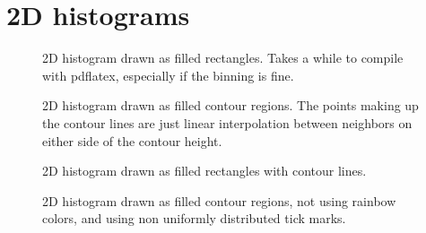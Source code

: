 \documentclass{article}
\begin{document}
\section{2D histograms}
\begin{figure}[H]
\centering

\captionsetup{singlelinecheck=off}
\caption[asdf]{2D histogram drawn as filled rectangles. Takes a while to compile with pdflatex, 
especially if the binning is fine.}
\end{figure}
\begin{figure}[H]
\centering

\captionsetup{singlelinecheck=off}
\caption[asdf]{2D histogram drawn as filled contour regions. The points making up the contour lines 
are just linear interpolation between neighbors on either side of the contour height.}
\end{figure}
\begin{figure}[H]
\centering

\captionsetup{singlelinecheck=off}
\caption[asdf]{2D histogram drawn as filled rectangles with contour lines.}
\end{figure}
\begin{figure}[H]
\centering

\captionsetup{singlelinecheck=off}
\caption[asdf]{2D histogram drawn as filled contour regions, not using rainbow colors, and using
non uniformly distributed tick marks.}
\end{figure}
\end{document}

